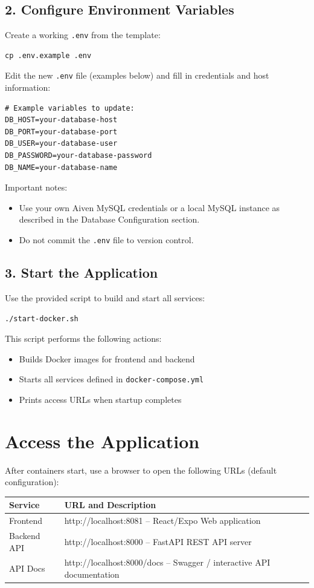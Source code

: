 \documentclass[11pt]{article}
\begin{document}
\subsection{2. Configure Environment Variables}
Create a working \texttt{.env} from the template:
\begin{Verbatim}[fontsize=\small]
cp .env.example .env
\end{Verbatim}

Edit the new \texttt{.env} file (examples below) and fill in credentials and host information:
\begin{Verbatim}[fontsize=\small]
# Example variables to update:
DB_HOST=your-database-host
DB_PORT=your-database-port
DB_USER=your-database-user
DB_PASSWORD=your-database-password
DB_NAME=your-database-name
\end{Verbatim}

Important notes:
\begin{itemize}
	\item Use your own Aiven MySQL credentials or a local MySQL instance as described in the Database Configuration section.
	\item Do not commit the \texttt{.env} file to version control.
\end{itemize}

\subsection{3. Start the Application}
Use the provided script to build and start all services:
\begin{Verbatim}[fontsize=\small]
./start-docker.sh
\end{Verbatim}

This script performs the following actions:
\begin{itemize}
	\item Builds Docker images for frontend and backend
	\item Starts all services defined in \texttt{docker-compose.yml}
	\item Prints access URLs when startup completes
\end{itemize}

\section{Access the Application}
After containers start, use a browser to open the following URLs (default configuration):
\begin{longtable}{p{} p{}}
\textbf{Service} & \textbf{URL and Description} \\
\hline
Frontend & http://localhost:8081 -- React/Expo Web application \\
Backend API & http://localhost:8000 -- FastAPI REST API server \\
API Docs & http://localhost:8000/docs -- Swagger / interactive API documentation \\
\end{longtable}
\end{document}
